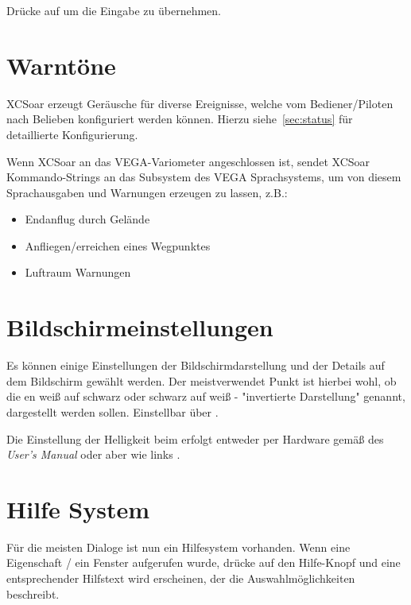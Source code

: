 Drücke auf   um die Eingabe zu übernehmen.

\section{Warntöne}

\textsf{XCSoar} erzeugt Geräusche für diverse Ereignisse, welche vom Bediener/Piloten  nach Belieben konfiguriert werden können.
Hierzu siehe~\ref{sec:status} für detaillierte Konfigurierung.

Wenn \textsf{XCSoar} an das VEGA-Variometer angeschlossen ist,  sendet \textsf{XCSoar} Kommando-Strings an das Subsystem des VEGA Sprachsystems, um von diesem Sprachausgaben und Warnungen erzeugen zu lassen, z.B.:

\begin{itemize}
\item Endanflug durch Gelände
\item Anfliegen/erreichen eines Wegpunktes
\item Luftraum Warnungen
\end{itemize}

\section{Bildschirmeinstellungen}

Es können einige Einstellungen der Bildschirmdarstellung und der Details auf dem Bildschirm gewählt werden.  Der meistverwendet Punkt  ist hierbei wohl, ob die {\InfoBox}en weiß auf schwarz oder schwarz auf weiß - "invertierte Darstellung" genannt, dargestellt werden sollen.  Einstellbar über . 

Die Einstellung der Helligkeit beim \al erfolgt entweder per Hardware gemäß des {\em \al User's Manual} oder aber wie links .  




\section{Hilfe System}
  Für die meisten Dialoge ist nun ein Hilfesystem vorhanden.
  Wenn eine Eigenschaft / ein Fenster  aufgerufen wurde, drücke auf den Hilfe-Knopf und eine entsprechender Hilfstext wird erscheinen, der die Auswahlmöglichkeiten  beschreibt. 

